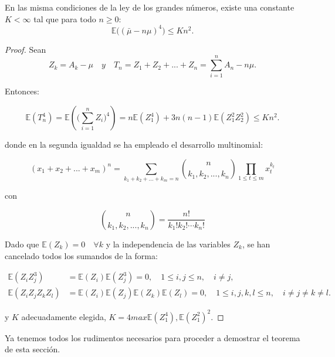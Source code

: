 \documentclass[../proyecto.tex]{memoir}
\begin{document}
\begin{lema}
En las misma condiciones de la ley de los grandes números, existe una constante $ K < \infty $ tal que para todo $ n \geq 0$:
$$
	\mathds{E} \big( ( \bar{ \mu } - n \mu ) ^ 4 \big) \leq K n^2.
$$
\end{lema}

\begin{proof}

Sean 
$$
Z_k = A_k - \mu \quad y \quad T_n = Z_1 + Z_2 + ... + Z_n = \sum_{i=1}^{n} A_n - n\mu. 
$$

Entonces:

$$
	\mathds{E} ( T_{n}^{4} ) = \mathds{E} ( \big( \sum_{i=1}^{n} Z_i \big) ^{4} ) = n\mathds{E}(Z_{1}^4)+3n(n-1)\mathds{E}(Z_1^2 Z_2^2) \leq Kn^2.
$$

donde en la segunda igualdad se ha empleado el desarrollo multinomial:

$$
(x_1+x_2+...+x_m)^n = \sum_{k_1+k_2+...+k_m=n} { n \choose k_1,k_2, ..., k_n} \prod_{1 \leq t \leq m} x_t^{k_t}
$$

con

$$
{ n \choose k_1,k_2, ..., k_n} = \frac{n!}{k_1!k_2! \dotsb k_n!}
$$

Dado que $\mathds{E}(Z_k)=0 \quad \forall k$ y la independencia de las variables $Z_k$, se han cancelado todos los sumandos de la forma:

\begin{align*}
	\mathds{E} (Z_{i} Z_{j}^3 ) &=\mathds{E} (Z_{i}) \mathds{E} (Z_{j}^3) = 0, \quad 1 \leq i,j \leq n, \quad i \neq j, \\
	\mathds{E} ( Z_{i} Z_{j} Z_{k} Z_{l} ) &= \mathds{E} (Z_{i}) \mathds{E} (Z_{j}) \mathds{E} (Z_{k}) \mathds{E} (Z_{l}) = 0, \quad 1 \leq i,j,k,l \leq n, \quad i \neq j \neq k \neq l.
\end{align*}

y $K$ adecuadamente elegida, $K = 4 max{\mathds{E}(Z_1^4), \mathds{E}(Z_1^2)^2}$.
\end{proof}

Ya tenemos todos los rudimentos necesarios para proceder a demostrar el teorema de esta sección.
\end{document}
